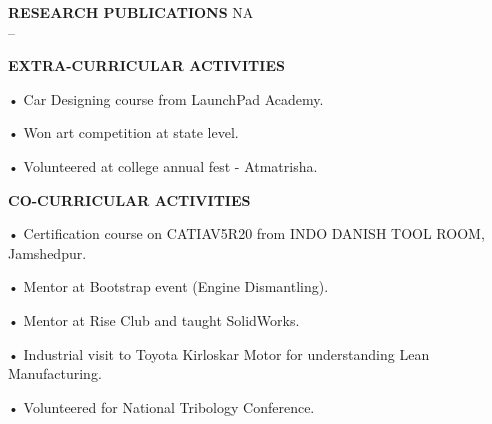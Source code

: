 \documentclass{article}
\begin{document}
\textbf{\LARGE RESEARCH PUBLICATIONS} \hspace{190pt}NA\\
--\vspace{10px}


\textbf{\LARGE EXTRA-CURRICULAR ACTIVITIES}
\begin{itemize}
	{\large \item •	Car Designing course from LaunchPad Academy. }
	{\large \item •	Won art competition at state level.}
	{\large \item •	Volunteered at college annual fest - Atmatrisha. }
\end{itemize}\vspace{15px}

\textbf{\LARGE CO-CURRICULAR ACTIVITIES}
\begin{enumerate}
{\large \item •	Certification course on CATIAV5R20 from INDO DANISH TOOL ROOM, Jamshedpur. }
{\large \item •	Mentor at Bootstrap event (Engine Dismantling). }
{\large \item •	Mentor at Rise Club and taught SolidWorks. }
{\large \item •	Industrial visit to Toyota Kirloskar Motor for understanding Lean Manufacturing. }
{\large \item •	Volunteered for National Tribology Conference. }
\end{enumerate}\vspace{15px}

	
\end{document}
